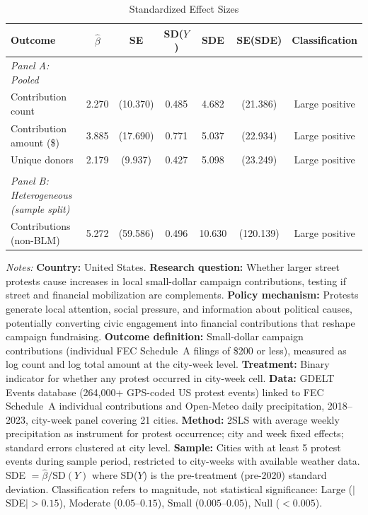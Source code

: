 \begin{table}[t]
\centering
\caption{Standardized Effect Sizes}
\label{tab:sde}
\begin{threeparttable}
\footnotesize
\begin{tabular}{lcccccc}
\toprule
Outcome & $\hat{\beta}$ & SE & SD($Y$) & SDE & SE(SDE) & Classification \\
\midrule
\emph{Panel A: Pooled} \\[3pt]
  Contribution count & 2.270 & (10.370) & 0.485 & 4.682 & (21.386) & Large positive \\
  Contribution amount (\$) & 3.885 & (17.690) & 0.771 & 5.037 & (22.934) & Large positive \\
  Unique donors & 2.179 & (9.937) & 0.427 & 5.098 & (23.249) & Large positive \\
\\[6pt]
\emph{Panel B: Heterogeneous (sample split)} \\[3pt]
  Contributions (non-BLM) & 5.272 & (59.586) & 0.496 & 10.630 & (120.139) & Large positive \\
\bottomrule
\end{tabular}
\begin{tablenotes}[flushleft]
\footnotesize
\item \textit{Notes:} \textbf{Country:} United States. \textbf{Research question:} Whether larger street protests cause increases in local small-dollar campaign contributions, testing if street and financial mobilization are complements. \textbf{Policy mechanism:} Protests generate local attention, social pressure, and information about political causes, potentially converting civic engagement into financial contributions that reshape campaign fundraising. \textbf{Outcome definition:} Small-dollar campaign contributions (individual FEC Schedule~A filings of \$200 or less), measured as log count and log total amount at the city-week level. \textbf{Treatment:} Binary indicator for whether any protest occurred in city-week cell. \textbf{Data:} GDELT Events database (264,000+ GPS-coded US protest events) linked to FEC Schedule~A individual contributions and Open-Meteo daily precipitation, 2018--2023, city-week panel covering 21 cities. \textbf{Method:} 2SLS with average weekly precipitation as instrument for protest occurrence; city and week fixed effects; standard errors clustered at city level. \textbf{Sample:} Cities with at least 5 protest events during sample period, restricted to city-weeks with available weather data. SDE $= \hat{\beta} / \text{SD}(Y)$ where SD($Y$) is the pre-treatment (pre-2020) standard deviation. Classification refers to magnitude, not statistical significance: Large ($|$SDE$| > 0.15$), Moderate ($0.05$--$0.15$), Small ($0.005$--$0.05$), Null ($< 0.005$).
\end{tablenotes}
\end{threeparttable}
\end{table}
